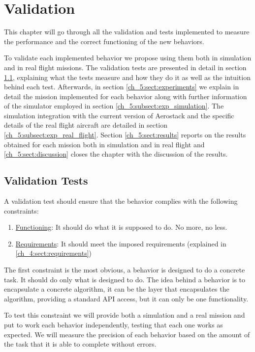 \chapter{Validation} \label{ch_5:chapter}

  This chapter will go through all the validation and tests implemented to measure the performance and the correct functioning of the new behaviors. 

  To validate each implemented behavior we propose using them both in simulation and in real flight missions. The validation tests are presented in detail in section \ref{ch_5:sect:val_tests}, explaining what the tests measure and how they do it as well as the intuition behind each test. Afterwards, in section \ref{ch_5:sect:experiments} we explain in detail the mission implemented for each behavior along with further information of the simulator employed in section \ref{ch_5:subsect:exp_simulation}. The simulation integration with the current version of Aerostack and the specific details of the real flight aircraft are detailed in section \ref{ch_5:subsect:exp_real_flight}. Section \ref{ch_5:sect:results} reports on the results obtained for each mission both in simulation and in real flight and \ref{ch_5:sect:discussion} closes the chapter with the discussion of the results.
 
\section{Validation Tests} \label{ch_5:sect:val_tests}

  A validation test should ensure that the behavior complies with the following constraints:

  \begin{enumerate}
    \item \underline{Functioning}: It should do what it is supposed to do. No more, no less.
    \item \underline{Requirements}: It should meet the imposed requirements (explained in \ref{ch_4:sect:requirements})
  \end{enumerate}

  The first constraint is the most obvious, a behavior is designed to do a concrete task. It should do only what is designed to do. The idea behind a behavior is to encapsulate a concrete algorithm, it can be the layer that encapsulates the algorithm, providing a standard API access, but it can only be one functionality.

  To test this constraint we will provide both a simulation and a real mission and put to work each behavior independently, testing that each one works as expected. We will measure the precision of each behavior based on the amount of the task that it is able to complete without errors.

